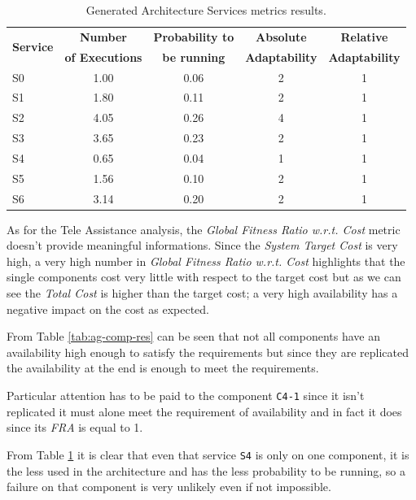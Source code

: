 \begin{table}[ht!b]
	\centering
	\begin{tabular}{|l|c|c|c|c|}
		\hline 
		\multirow{2}{*}{\textbf{Service}} & \textbf{Number} & \textbf{Probability to} & \textbf{Absolute} & \textbf{Relative} \\ 
		& \textbf{of Executions} & \textbf{be running} & \textbf{Adaptability} & \textbf{Adaptability} \\
		\hline 
		S0 & 1.00 & 0.06 & 2 & 1 \\
		\hline 
		S1 & 1.80 & 0.11 & 2 & 1 \\
		\hline 
		S2 & 4.05 & 0.26 & 4 & 1 \\
		\hline 
		S3 & 3.65 & 0.23 & 2 & 1 \\
		\hline
		S4 & 0.65 & 0.04 & 1 & 1 \\
		\hline
		S5 & 1.56 & 0.10 & 2 & 1 \\
		\hline
		S6 & 3.14 & 0.20 & 2 & 1 \\
		\hline
	\end{tabular} 
	\caption[Generated Architecture Service Services Metrics]{Generated Architecture Services metrics results.}
	\label{tab:ag-serv-res}
\end{table}


As for the Tele Assistance analysis, the \emph{Global Fitness Ratio w.r.t. Cost} metric doesn't provide meaningful informations. Since the \emph{System Target Cost} is very high, a very high number in \emph{Global Fitness Ratio w.r.t. Cost} highlights that the single components cost very little with respect to the target cost but as we can see the \emph{Total Cost} is higher than the target cost; a very high availability has a negative impact on the cost as expected. 

From Table \ref{tab:ag-comp-res} can be seen that not all components have an availability high enough to satisfy the requirements but since they are replicated the availability at the end is enough to meet the requirements.

Particular attention has to be paid to the component \texttt{C4-1} since it isn't replicated it must alone meet the requirement of availability and in fact it does since its \emph{FRA} is equal to 1.

From Table \ref{tab:ag-serv-res} it is clear that even that service \texttt{S4} is only on one component, it is the less used in the architecture and has the less probability to be running, so a failure on that component is very unlikely even if not impossible.